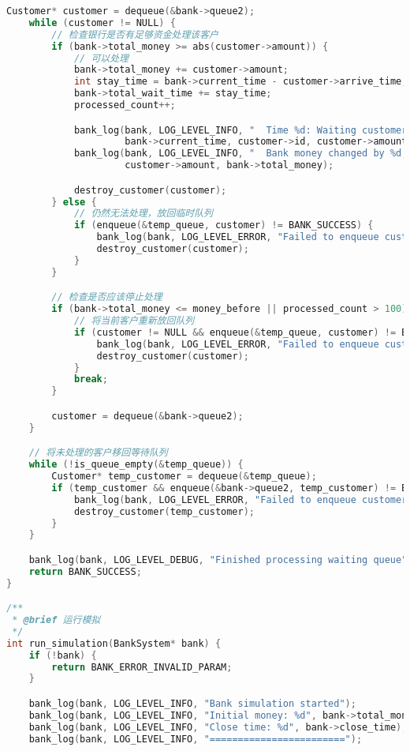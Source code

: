 \documentclass[12pt,a4paper]{article}
\begin{document}
\begin{lstlisting}[language=C,caption=bank\_simulation.c]
    Customer* customer = dequeue(&bank->queue2);
    while (customer != NULL) {
        // 检查银行是否有足够资金处理该客户
        if (bank->total_money >= abs(customer->amount)) {
            // 可以处理
            bank->total_money += customer->amount;
            int stay_time = bank->current_time - customer->arrive_time;
            bank->total_wait_time += stay_time;
            processed_count++;

            bank_log(bank, LOG_LEVEL_INFO, "  Time %d: Waiting customer %d completed transaction, amount %d, total stay time %d", 
                     bank->current_time, customer->id, customer->amount, stay_time);
            bank_log(bank, LOG_LEVEL_INFO, "  Bank money changed by %d, current total %d", 
                     customer->amount, bank->total_money);

            destroy_customer(customer);
        } else {
            // 仍然无法处理，放回临时队列
            if (enqueue(&temp_queue, customer) != BANK_SUCCESS) {
                bank_log(bank, LOG_LEVEL_ERROR, "Failed to enqueue customer %d to temp queue", customer->id);
                destroy_customer(customer);
            }
        }

        // 检查是否应该停止处理
        if (bank->total_money <= money_before || processed_count > 100) {
            // 将当前客户重新放回队列
            if (customer != NULL && enqueue(&temp_queue, customer) != BANK_SUCCESS) {
                bank_log(bank, LOG_LEVEL_ERROR, "Failed to enqueue customer %d to temp queue", customer->id);
                destroy_customer(customer);
            }
            break;
        }

        customer = dequeue(&bank->queue2);
    }

    // 将未处理的客户移回等待队列
    while (!is_queue_empty(&temp_queue)) {
        Customer* temp_customer = dequeue(&temp_queue);
        if (temp_customer && enqueue(&bank->queue2, temp_customer) != BANK_SUCCESS) {
            bank_log(bank, LOG_LEVEL_ERROR, "Failed to enqueue customer %d back to waiting queue", temp_customer->id);
            destroy_customer(temp_customer);
        }
    }

    bank_log(bank, LOG_LEVEL_DEBUG, "Finished processing waiting queue");
    return BANK_SUCCESS;
}

/**
 * @brief 运行模拟
 */
int run_simulation(BankSystem* bank) {
    if (!bank) {
        return BANK_ERROR_INVALID_PARAM;
    }

    bank_log(bank, LOG_LEVEL_INFO, "Bank simulation started");
    bank_log(bank, LOG_LEVEL_INFO, "Initial money: %d", bank->total_money);
    bank_log(bank, LOG_LEVEL_INFO, "Close time: %d", bank->close_time);
    bank_log(bank, LOG_LEVEL_INFO, "========================");


\end{lstlisting}
\end{document}
